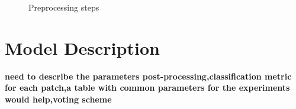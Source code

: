 \documentclass{article}
\begin{document}
\begin{figure}[htbp]
    \centering
    \hspace{0.5cm}
    \caption{Preprocessing steps}
    \label{fig:preprocessing_steps}
\end{figure}



\section{Model Description} %
\label{sec:model_description}

\textbf{need to describe the parameters post-processing,classification metric for each patch,a table with common parameters for the experiments would help,voting scheme}
\end{document}
